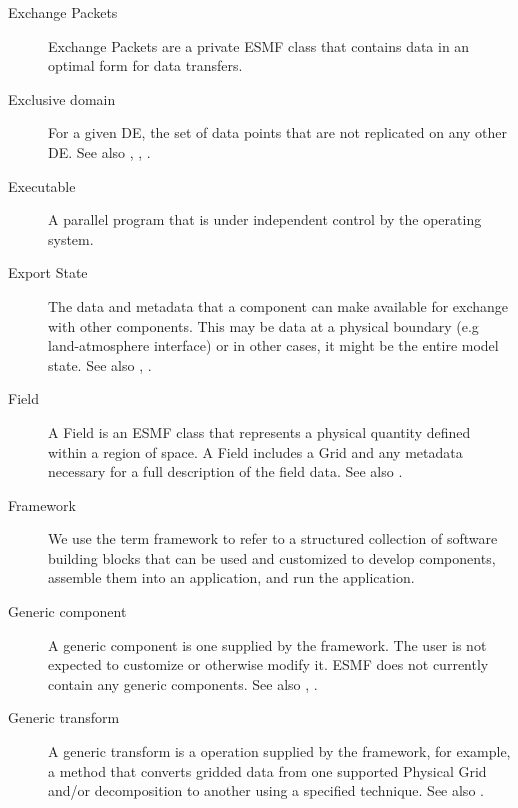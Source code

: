\begin{description}
\item[Exchange Packets] \label{glos:EP} Exchange Packets are a private
  ESMF class that contains data in an optimal form for data transfers.

\item[Exclusive domain] \label{glos:ExcDomain} For a given DE, the 
  set of data points that are not replicated on any other DE.  See also 
  ,
  , .

\item[Executable] \label{glos:Exec} 
  A parallel program that is under independent control by the operating 
  system.

\item[Export State] \label{glos:ExportState} The data and metadata that 
  a component can make available for exchange with other components. 
  This may be data at a physical boundary (e.g land-atmosphere interface) 
  or in other cases, it might be the entire model state.  
  See also , .

\item[Field] \label{glos:Field} A Field is an ESMF class that represents
  a physical quantity
  defined within a region of space.  A Field includes a Grid 
  and any metadata necessary for a full description of the field data.
  See also .

\item[Framework] \label{glos:Framework} We use the term framework to 
  refer to a structured collection of software building blocks that can be used 
  and customized to develop components, assemble them into an application, and 
  run the application.

\item[Generic component] \label{glos:GenericComp} A generic component
  is one supplied by the framework.  The user is not expected to 
  customize or otherwise modify it.  ESMF does not currently contain any
  generic components.  See also , 
  . 

\item[Generic transform] \label{glos:GenericTrans} A generic transform 
  is a operation supplied by the framework, for example, a method 
  that converts gridded data from one supported Physical Grid and/or 
  decomposition to another using a specified technique.  See also .


\end{description}

